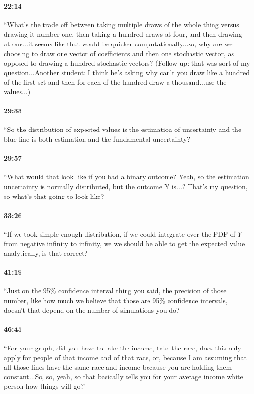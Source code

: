 \documentclass[11pt]{article}
\begin{document}
\paragraph{22:14} ``What's the trade off between taking multiple draws of the whole thing versus drawing it number one, then taking a hundred draws at four, and then drawing at one...it seems like that would be quicker computationally...so, why are we choosing to draw one vector of coefficients and then one stochastic vector, as opposed to drawing a hundred stochastic vectors? (Follow up: that was sort of my question...Another student: I think he's asking why can't you draw like a hundred of the first set and then for each of the hundred draw a thousand...use the values...)

\paragraph{29:33} ``So the distribution of expected values is the estimation of uncertainty and the blue line is both estimation and the fundamental uncertainty?

\paragraph{29:57} ``What would that look like if you had a binary outcome? Yeah, so the estimation uncertainty is normally distributed, but the outcome Y is...? That's my question, so what's that going to look like?

\paragraph{33:26} ``If we took simple enough distribution, if we could integrate over the PDF of $Y$ from negative infinity to infinity, we we should be able to get the expected value analytically, is that correct?

\paragraph{41:19} ``Just on the 95\% confidence interval thing you said, the precision of those number, like how much we believe that those are 95\% confidence intervals, doesn't that depend on the number of simulations you do?

\paragraph{46:45} ``For your graph, did you have to take the income, take the race, does this only apply for people of that income and of that race, or, because I am assuming that all those lines have the same race and income because you are holding them constant...So, so, yeah, so that basically tells you for your average income white person how things will go?"
\end{document}
